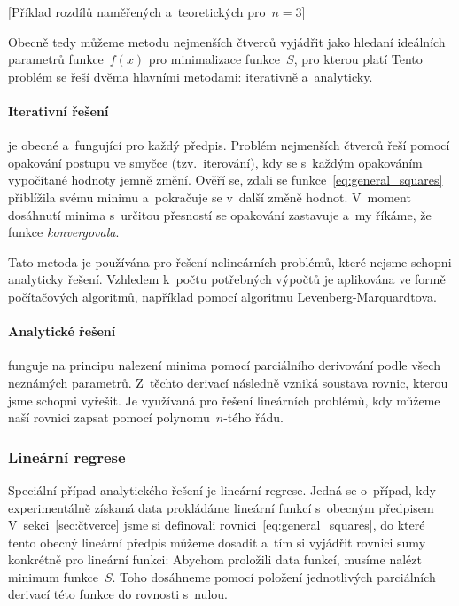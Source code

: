 [Příklad rozdílů naměřených a~teoretických pro~$n=3$]

Obecně tedy můžeme metodu nejmenších čtverců vyjádřit jako hledaní ideálních 
parametrů funkce~$f(x)$ pro minimalizace funkce~$S$, pro kterou platí
Tento problém se řeší dvěma hlavními metodami: iterativně a~analyticky.

\paragraph{Iterativní řešení} je obecné a~fungující pro každý předpis. Problém
nejmenších čtverců řeší pomocí opakování postupu ve smyčce (tzv.~iterování),
kdy se s~každým opakováním vypočítané hodnoty jemně změní. Ověří se, zdali se
funkce~\eqref{eq:general_squares} přiblížila svému minimu a~pokračuje se
v~další změně hodnot. V~moment dosáhnutí minima s~určitou přesností se
opakování zastavuje a~my říkáme, že funkce \emph{konvergovala}.

Tato metoda je používána pro řešení nelineárních problémů, které nejsme schopni
analyticky řešení. Vzhledem k~počtu potřebných výpočtů je aplikována ve formě
počítačových algoritmů, například pomocí algoritmu Levenberg-Marquardtova.

\paragraph{Analytické řešení} funguje na principu nalezení minima pomocí
parciálního derivování podle všech neznámých parametrů. Z~těchto derivací
následně vzniká soustava rovnic, kterou jsme schopni vyřešit. Je využívaná pro
řešení lineárních problémů, kdy můžeme naší rovnici zapsat  pomocí
polynomu~$n$-tého řádu.

\subsubsection{Lineární regrese}
\label{sec:lin-regrese}
Speciální případ analytického řešení je lineární regrese. Jedná se o~případ,
kdy experimentálně získaná data prokládáme lineární funkcí s~obecným předpisem
V~sekci~\ref{sec:čtverce} jsme si definovali rovnici~\eqref{eq:general_squares},
do které tento obecný lineární předpis můžeme dosadit a~tím si vyjádřit rovnici
sumy konkrétně pro lineární funkci:
Abychom proložili data funkcí, musíme nalézt minimum funkce~$S$. Toho dosáhneme
pomocí položení jednotlivých parciálních derivací této funkce do rovnosti
s~nulou.~\cite{wolfram} 

